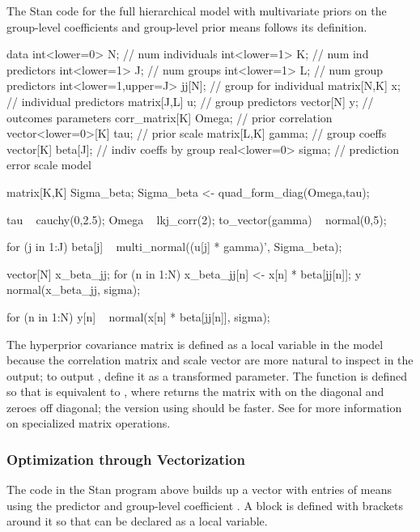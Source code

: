The Stan code for the full hierarchical model with multivariate priors
on the group-level coefficients and group-level prior means follows
its definition.
%
\begin{stancode}
data {
  int<lower=0> N;              // num individuals
  int<lower=1> K;              // num ind predictors
  int<lower=1> J;              // num groups
  int<lower=1> L;              // num group predictors
  int<lower=1,upper=J> jj[N];  // group for individual
  matrix[N,K] x;               // individual predictors
  matrix[J,L] u;               // group predictors
  vector[N] y;                 // outcomes
}
parameters {
  corr_matrix[K] Omega;        // prior correlation
  vector<lower=0>[K] tau;      // prior scale
  matrix[L,K] gamma;           // group coeffs
  vector[K] beta[J];           // indiv coeffs by group
  real<lower=0> sigma;         // prediction error scale
}
model {
  matrix[K,K] Sigma_beta;
  Sigma_beta <- quad_form_diag(Omega,tau);

  tau ~ cauchy(0,2.5);
  Omega ~ lkj_corr(2);
  to_vector(gamma) ~ normal(0,5);

  for (j in 1:J)
    beta[j] ~ multi_normal((u[j] * gamma)', Sigma_beta);

  {
    vector[N] x_beta_jj;
    for (n in 1:N)
      x_beta_jj[n] <- x[n] * beta[jj[n]];
    y ~ normal(x_beta_jj, sigma);
  }

  for (n in 1:N)
    y[n] ~ normal(x[n] * beta[jj[n]], sigma);
}
\end{stancode}
%
The hyperprior covariance matrix is defined as a local variable in the
model because the correlation matrix  and scale vector
 are more natural to inspect in the output; to output
, define it as a transformed parameter.  The function
 is defined so that
 is equivalent to
, where
 returns the matrix with  on the
diagonal and zeroes off diagonal; the version using
 should be faster.  See
 for more information on
specialized matrix operations.

\subsubsection{Optimization through Vectorization}

The code in the Stan program above builds up a vector with entries
 of means using the predictor  and
group-level coefficient .  A block is defined with
brackets around it so that  can be declared as a
local variable.  

